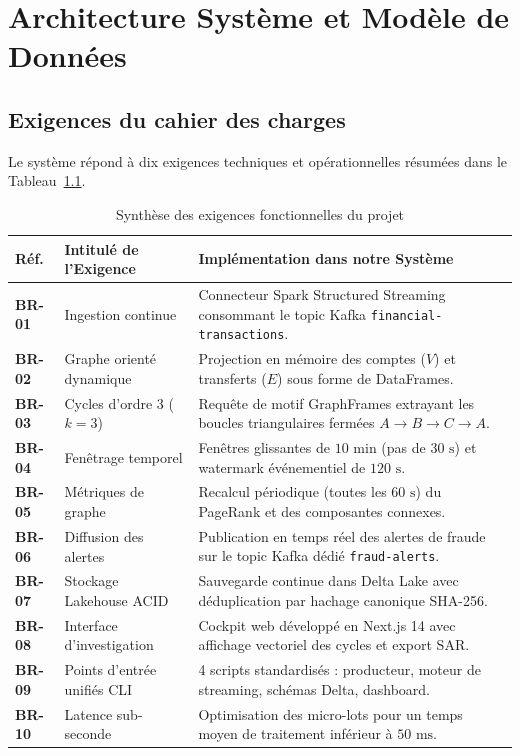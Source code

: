 
\chapter{Architecture Système et Modèle de Données}
\label{ch:architecture}

\section{Exigences du cahier des charges}

Le système répond à dix exigences techniques et opérationnelles résumées dans le Tableau~\ref{tab:business_requirements}.

\begin{table}[htbp]
\centering
\caption{Synthèse des exigences fonctionnelles du projet}
\label{tab:business_requirements}
\scriptsize
\setlength{\tabcolsep}{3pt}
\renewcommand{\arraystretch}{0.88}
\begin{tabularx}{\textwidth}{l p{3.6cm} X}
\toprule
\textbf{Réf.} & \textbf{Intitulé de l'Exigence} & \textbf{Implémentation dans notre Système} \\
\midrule
\textbf{BR-01} & Ingestion continue & Connecteur Spark Structured Streaming consommant le topic Kafka \texttt{financial-transactions}. \\
\textbf{BR-02} & Graphe orienté dynamique & Projection en mémoire des comptes ($V$) et transferts ($E$) sous forme de DataFrames. \\
\textbf{BR-03} & Cycles d'ordre 3 ($k=3$) & Requête de motif GraphFrames extrayant les boucles triangulaires fermées $A \to B \to C \to A$. \\
\textbf{BR-04} & Fenêtrage temporel & Fenêtres glissantes de $10\text{ min}$ (pas de $30\text{ s}$) et watermark événementiel de $120\text{ s}$. \\
\textbf{BR-05} & Métriques de graphe & Recalcul périodique (toutes les $60\text{ s}$) du PageRank et des composantes connexes. \\
\textbf{BR-06} & Diffusion des alertes & Publication en temps réel des alertes de fraude sur le topic Kafka dédié \texttt{fraud-alerts}. \\
\textbf{BR-07} & Stockage Lakehouse ACID & Sauvegarde continue dans Delta Lake avec déduplication par hachage canonique SHA-256. \\
\textbf{BR-08} & Interface d'investigation & Cockpit web développé en Next.js 14 avec affichage vectoriel des cycles et export SAR. \\
\textbf{BR-09} & Points d'entrée unifiés CLI & 4 scripts standardisés : producteur, moteur de streaming, schémas Delta, dashboard. \\
\textbf{BR-10} & Latence sub-seconde & Optimisation des micro-lots pour un temps moyen de traitement inférieur à $50\text{ ms}$. \\
\bottomrule
\end{tabularx}
\end{table}

